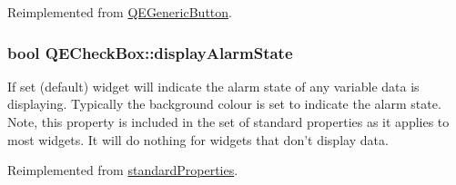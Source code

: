 Reimplemented from \hyperlink{classQEGenericButton}{QEGenericButton}.

\hypertarget{classQECheckBox_ad5d25fa41def4241df71dee0d003efc4}{
\subsubsection[{displayAlarmState}]{\setlength{\rightskip}{0pt plus 5cm}bool QECheckBox::displayAlarmState}}
\label{classQECheckBox_ad5d25fa41def4241df71dee0d003efc4}
If set (default) widget will indicate the alarm state of any variable data is displaying. Typically the background colour is set to indicate the alarm state. Note, this property is included in the set of standard properties as it applies to most widgets. It will do nothing for widgets that don't display data. 

Reimplemented from \hyperlink{classstandardProperties}{standardProperties}.

